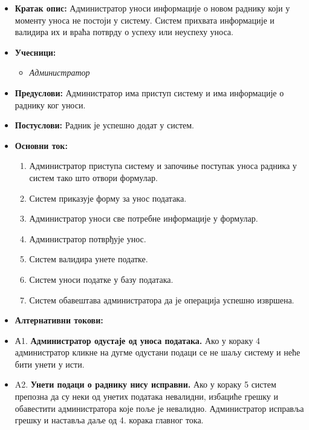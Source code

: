 \documentclass{article}
\begin{document}
\begin{itemize}
    \item \textbf{Кратак опис:} Администратор уноси информације о новом раднику који у моменту уноса не постоји у систему. Систем прихвата информације и валидира их и враћа потврду о успеху или неуспеху уноса.
    \item \textbf{Учесници:}
        \begin{itemize}
            \item \textit{Администратор}
        \end{itemize}
    \item \textbf{Предуслови:} Администратор има приступ систему и има информације о раднику ког уноси.
    \item \textbf{Постуслови:} Радник је успешно додат у систем.
    \item \textbf{Основни ток:}
        \begin{enumerate}
            \item Администратор приступа систему и започиње поступак уноса радника у систем тако што отвори формулар.
            \item Систем приказује форму за унос података.
            \item Администратор уноси све потребне информације у формулар.
            \item Администратор потврђује унос.
            \item Систем валидира унете податке.
            \item Систем уноси податке у базу података.
            \item Систем обавештава администратора да је операција успешно извршена.
        \end{enumerate}
    
    \item \textbf{Алтернативни токови:}
    \item А1. \textbf{Администратор одустаје од уноса података.} Ако у кораку 4 администратор кликне на дугме одустани подаци се не шаљу систему и неће бити унети у исти.
    \item A2. \textbf{Унети подаци о раднику нису исправни.} Ако у кораку 5 систем препозна да су неки од унетих података невалидни, избациће грешку и обавестити администратора које поље је невалидно. Администратор исправља грешку и наставља даље од 4. корака главног тока. 
\end{itemize}
\end{document}

